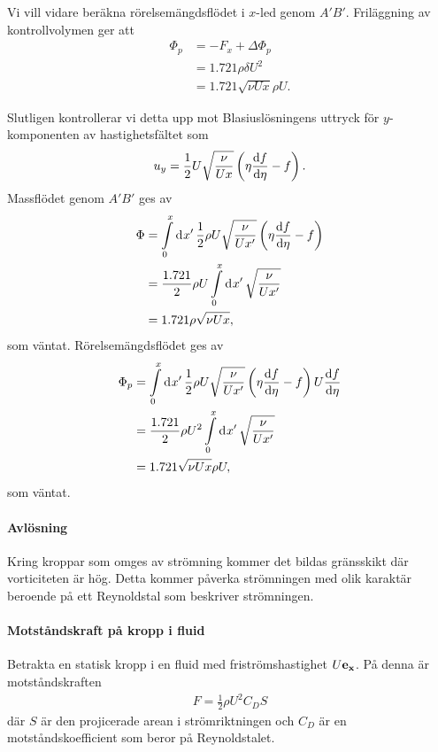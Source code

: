 Vi vill vidare beräkna rörelsemängdsflödet i $x$-led genom $A'B'$. Friläggning av kontrollvolymen ger att
\begin{align*}
	\Phi_{p} &= -F_{x} + \Delta\Phi_{p} \\
	         &= 1.721\rho\delta U^{2} \\
	         &= 1.721\sqrt{\nu Ux}\rho U.
\end{align*}

Slutligen kontrollerar vi detta upp mot Blasiuslösningens uttryck för $y$-komponenten av hastighetsfältet som
\begin{align*}
	u_{y} = \frac{1}{2}U\sqrt{\frac{\nu}{Ux}}\left(\eta\dv{f}{\eta} - f\right).
\end{align*}
Massflödet genom $A'B'$ ges av
\begin{align*}
	\Phi &= \int\limits_{0}^{x}\dd[]{x'}\frac{1}{2}\rho U\sqrt{\frac{\nu}{Ux'}}\left(\eta\dv{f}{\eta} - f\right) \\
	     &= \frac{1.721}{2}\rho U\int\limits_{0}^{x}\dd[]{x'}\sqrt{\frac{\nu}{Ux'}} \\
	     &= 1.721\rho\sqrt{\nu Ux},
\end{align*}
som väntat. Rörelsemängdsflödet ges av
\begin{align*}
	\Phi_{p} &= \int\limits_{0}^{x}\dd[]{x'}\frac{1}{2}\rho U\sqrt{\frac{\nu}{Ux'}}\left(\eta\dv{f}{\eta} - f\right)U\dv{f}{\eta} \\
	         &= \frac{1.721}{2}\rho U^{2}\int\limits_{0}^{x}\dd[]{x'}\sqrt{\frac{\nu}{Ux'}} \\
	         &= 1.721\sqrt{\nu Ux}\rho U,
\end{align*}
som väntat.

\paragraph{Avlösning}
Kring kroppar som omges av strömning kommer det bildas gränsskikt där vorticiteten är hög. Detta kommer påverka strömningen med olik karaktär beroende på ett Reynoldstal som beskriver strömningen.

\paragraph{Motståndskraft på kropp i fluid}
Betrakta en statisk kropp i en fluid med friströmshastighet $U\vb{e}_{\vb{x}}$. På denna är motståndskraften
\begin{align*}
	F = \frac{1}{2}\rho U^{2}C_{D}S
\end{align*}
där $S$ är den projicerade arean i strömriktningen och $C_{D}$ är en motståndskoefficient som beror på Reynoldstalet.

